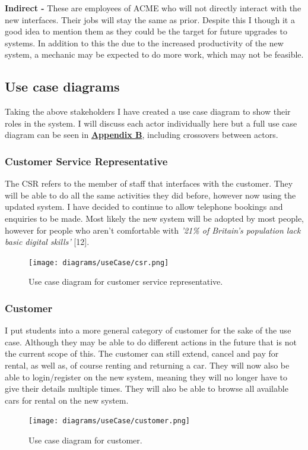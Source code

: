     \vspace{0.2cm}

    \noindent\textbf{Indirect -} These are employees of ACME who will not directly interact with the new interfaces. Their jobs will stay the same as prior. Despite
    this I though it a good idea to mention them as they could be the target for future upgrades to systems. In addition to this the due to the increased 
    productivity of the new system, a mechanic may be expected to do more work, which may not be feasible.

  \subsection{Use case diagrams}
    Taking the above stakeholders I have created a use case diagram to show their roles in the system. I will discuss each actor individually here but a full
    use case diagram can be seen in \hyperref[sec:AppendixB]{\textbf{Appendix B}}, including crossovers between actors.

    \subsubsection{Customer Service Representative}
      The CSR refers to the member of staff that interfaces with the customer. They will be able to do all the same activities they did before, however now using
      the updated system. I have decided to continue to allow telephone bookings and enquiries to be made. Most likely the new system will be
      adopted by most people, however for people who aren't comfortable with \textit{'21\% of Britain's population lack basic digital
      skills'} [12].
      \begin{figure}[H]
        \centering
        \texttt{[image: diagrams/useCase/csr.png]}
        \caption{Use case diagram for customer service representative.}
        \label{fig:UCcsr}
      \end{figure}

    \subsubsection{Customer}
      I put students into a more general category of customer for the sake of the use case. Although they may be able to do different actions in the future
      that is not the current scope of this. The customer can still extend, cancel and pay for rental, as well as, of course renting and returning a car.
      They will now also be able to login/register on the new system, meaning they will no longer have to give their details multiple times. They will also 
      be able to browse all available cars for rental on the new system.  
      \begin{figure}[H]
        \centering
        \texttt{[image: diagrams/useCase/customer.png]}
        \caption{Use case diagram for customer.}
        \label{fig:UCcustomer}
      \end{figure}
    
